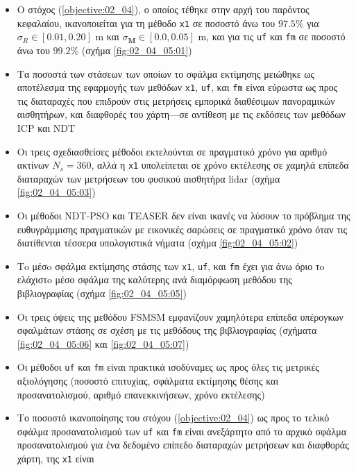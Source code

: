 \begin{itemize}
  \item Ο στόχος (\ref{objective:02_04}), ο οποίος τέθηκε στην αρχή του παρόντος
        κεφαλαίου, ικανοποιείται για τη μέθοδο \texttt{x1} σε ποσοστό άνω του
        $97.5\%$ για $\sigma_R \in [0.01, 0.20]$ m και
        $\sigma_{\bm{M}} \in [0.0, 0.05]$ m, και για τις \texttt{uf} και
        \texttt{fm} σε ποσοστό άνω του $99.2\%$ (σχήμα \ref{fig:02_04_05:01})
  \item Τα ποσοστά των στάσεων των οποίων το σφάλμα εκτίμησης μειώθηκε ως
        αποτέλεσμα της εφαρμογής των μεθόδων \texttt{x1}, \texttt{uf}, και
        \texttt{fm} είναι εύρωστα ως προς τις διαταραχές που επιδρούν στις
        μετρήσεις εμπορικά διαθέσιμων πανοραμικών αισθητήρων, και διαφθορές του
        χάρτη---σε αντίθεση με τις εκδόσεις των μεθόδων ICP και NDT
  \item Οι τρεις σχεδιασθείσες μέθοδοι εκτελούνται σε πραγματικό χρόνο για
        αριθμό ακτίνων $N_s = 360$, αλλά η \texttt{x1} υπολείπεται σε χρόνο
        εκτέλεσης σε χαμηλά επίπεδα διαταραχών των μετρήσεων του φυσικού
        αισθητήρα lidar (σχήμα \ref{fig:02_04_05:03})
  \item Οι μέθοδοι NDT-PSO και TEASER δεν είναι ικανές να λύσουν το πρόβλημα
        της ευθυγράμμισης πραγματικών με εικονικές σαρώσεις σε πραγματικό χρόνο
        όταν τις διατίθενται τέσσερα υπολογιστικά νήματα (σχήμα
        \ref{fig:02_04_05:02})
  \item Τo μέσo σφάλμα εκτίμησης στάσης των \texttt{x1}, \texttt{uf}, και
        \texttt{fm} έχει για άνω όριο τo ελάχιστo μέσο σφάλμα της καλύτερης
        ανά διαμόρφωση μεθόδου της βιβλιογραφίας (σχήμα \ref{fig:02_04_05:05})
  \item Οι τρεις όψεις της μεθόδου FSMSM εμφανίζουν χαμηλότερα επίπεδα
        υπέρογκων σφαλμάτων στάσης σε σχέση με τις μεθόδους της βιβλιογραφίας
        (σχήματα \ref{fig:02_04_05:06} και \ref{fig:02_04_05:07})
  \item Οι μέθοδοι \texttt{uf} και \texttt{fm} είναι πρακτικά ισοδύναμες ως προς
        όλες τις μετρικές αξιολόγησης (ποσοστό επιτυχίας, σφάλματα εκτίμησης
        θέσης και προσανατολισμού, αριθμό επανεκκινήσεων, χρόνο εκτέλεσης)
  \item Το ποσοστό ικανοποίησης του στόχου (\ref{objective:02_04}) ως προς
        το τελικό σφάλμα προσανατολισμού των \texttt{uf} και \texttt{fm} είναι
        ανεξάρτητο από το αρχικό σφάλμα προσανατολισμού για ένα δεδομένο επίπεδο
        διαταραχών μετρήσεων και διαφθοράς χάρτη, της \texttt{x1} είναι

\end{itemize}
